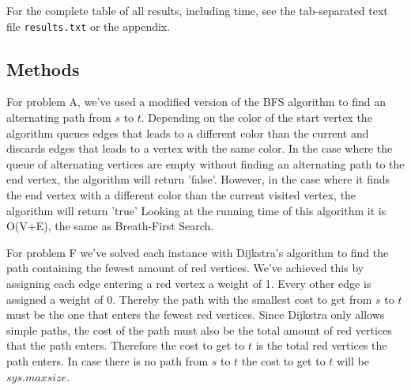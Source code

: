 \documentclass{tufte-handout}
\begin{document}
For the complete table of all results, including time, see the tab-separated text file {\tt results.txt} or the appendix.

\subsection{Methods}
For problem A, we've used a modified version of the BFS algorithm to find an alternating path from $s$ to $t$. Depending on the color of the start vertex the algorithm queues edges that leads to a different color than the current and discards edges that leads to a vertex with the same color. In the case where the queue of alternating vertices are empty without finding an alternating path to the end vertex, the algorithm will return 'false'. However, in the case where it finds the end vertex with a different color than the current visited vertex, the algorithm will return 'true'
Looking at the running time of this algorithm it is O(V+E), the same as Breath-First Search.

For problem F we've solved each instance with Dijkstra's algorithm to find the path containing the fewest amount of red vertices. We've achieved this by assigning each edge entering a red vertex a weight of 1. Every other edge is assigned a weight of 0. Thereby the path with the smallest cost to get from $s$ to $t$ must be the one that enters the fewest red vertices. Since Dijkstra only allows simple paths, the cost of the path must also be the total amount of red vertices that the path enters. Therefore the cost to get to $t$ is the total red vertices the path enters. In case there is no path from $s$ to $t$ the cost to get to $t$ will be $sys.maxsize$.
\end{document}
